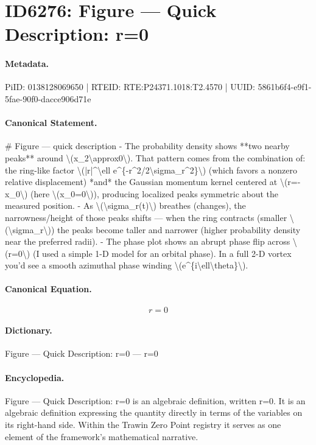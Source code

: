 \section*{ID6276: Figure — Quick Description: r=0}
\paragraph{Metadata.}
PiID: 0138128069650 | RTEID: RTE:P24371.1018:T2.4570 | UUID: 5861b6f4-e9f1-5fae-90f0-dacce906d71e

\paragraph{Canonical Statement.}
\# Figure — quick description - The probability density shows **two nearby peaks** around \textbackslash{}(x\_2\textbackslash{}approx0\textbackslash{}). That pattern comes from the combination of: the ring-like factor \textbackslash{}(|r|\textasciicircum{}\textbackslash{}ell e\textasciicircum{}\{-r\textasciicircum{}2/2\textbackslash{}sigma\_r\textasciicircum{}2\}\textbackslash{}) (which favors a nonzero relative displacement) *and* the Gaussian momentum kernel centered at \textbackslash{}(r=-x\_0\textbackslash{}) (here \textbackslash{}(x\_0=0\textbackslash{})), producing localized peaks symmetric about the measured position. - As \textbackslash{}(\textbackslash{}sigma\_r(t)\textbackslash{}) breathes (changes), the narrowness/height of those peaks shifts — when the ring contracts (smaller \textbackslash{}(\textbackslash{}sigma\_r\textbackslash{})) the peaks become taller and narrower (higher probability density near the preferred radii). - The phase plot shows an abrupt phase flip across \textbackslash{}(r=0\textbackslash{}) (I used a simple 1-D model for an orbital phase). In a full 2-D vortex you’d see a smooth azimuthal phase winding \textbackslash{}(e\textasciicircum{}\{i\textbackslash{}ell\textbackslash{}theta\}\textbackslash{}).

\paragraph{Canonical Equation.}
\[
r=0
\]

\paragraph{Dictionary.}
Figure — Quick Description: r=0 — r=0

\paragraph{Encyclopedia.}
Figure — Quick Description: r=0 is an algebraic definition, written r=0. It is an algebraic definition expressing the quantity directly in terms of the variables on its right-hand side. Within the Trawin Zero Point registry it serves as one element of the framework's mathematical narrative.

